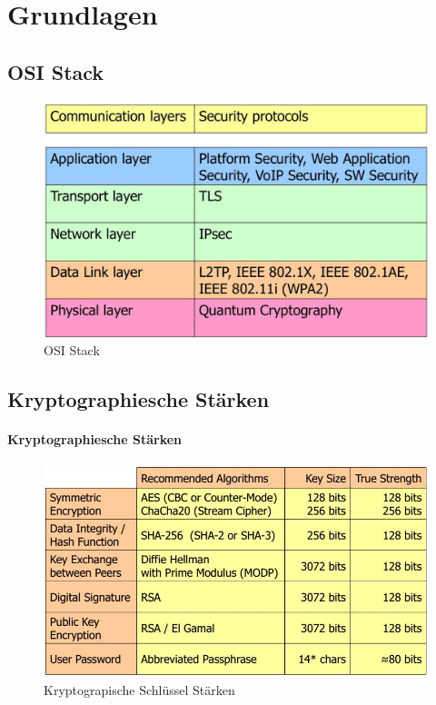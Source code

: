 


\newcommand{\SUBJECT}{Zusammenfassung}
\newcommand{\TITLE}{Informationssicherheit 2}




\section{Grundlagen}
\subsection{OSI Stack}
\begin{figure}[h]
\centering
\includegraphics[width=0.5\linewidth]{images/sec_osi_stack}
\caption{OSI Stack}
\end{figure}

\subsection{Kryptographiesche Stärken}
\paragraph{Kryptographiesche Stärken} \hfill
\begin{figure}[h!]
\centering
\includegraphics[width=0.5\linewidth]{images/cryptographical_strenght}
\caption{Kryptograpische Schlüssel Stärken}
\label{fig:cryptographicalstrenght}
\end{figure}

